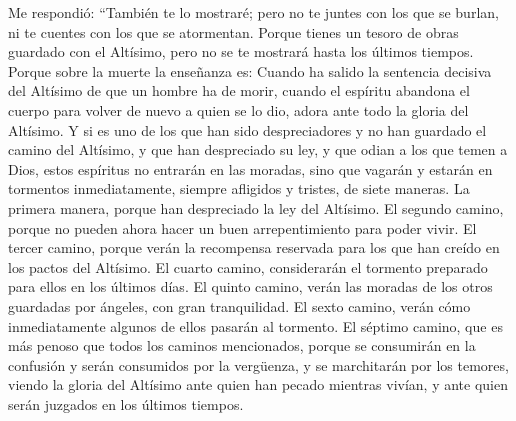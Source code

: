 Me respondió: ``También te lo mostraré; pero no te
juntes con los que se burlan, ni te cuentes con los que se atormentan.
 Porque tienes un tesoro de obras guardado con el
Altísimo, pero no se te mostrará hasta los últimos tiempos.
 Porque sobre la muerte la enseñanza es: Cuando ha salido
la sentencia decisiva del Altísimo de que un hombre ha de morir, cuando
el espíritu abandona el cuerpo para volver de nuevo a quien se lo dio,
adora ante todo la gloria del Altísimo.  Y si es uno de
los que han sido despreciadores y no han guardado el camino del
Altísimo, y que han despreciado su ley, y que odian a los que temen a
Dios,  estos espíritus no entrarán en las moradas, sino
que vagarán y estarán en tormentos inmediatamente, siempre afligidos y
tristes, de siete maneras.  La primera manera, porque han
despreciado la ley del Altísimo.  El segundo camino,
porque no pueden ahora hacer un buen arrepentimiento para poder vivir.
 El tercer camino, porque verán la recompensa reservada
para los que han creído en los pactos del Altísimo.  El
cuarto camino, considerarán el tormento preparado para ellos en los
últimos días.  El quinto camino, verán las moradas de los
otros guardadas por ángeles, con gran tranquilidad.  El
sexto camino, verán cómo inmediatamente algunos de ellos pasarán al
tormento.  El séptimo camino, que es más penoso que todos
los caminos mencionados, porque se consumirán en la confusión y serán
consumidos por la vergüenza, y se marchitarán por los temores, viendo la
gloria del Altísimo ante quien han pecado mientras vivían, y ante quien
serán juzgados en los últimos tiempos.

